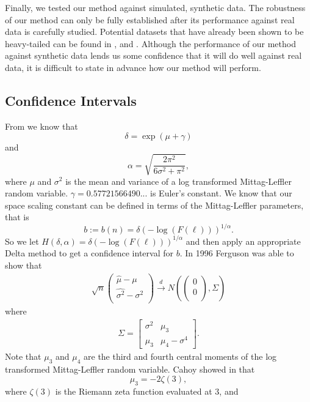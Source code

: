 \documentclass[honours,12pt]{unswthesis}
\newcommand{\1}{\mathbf 1}
\newcommand{\cd}{\overset{d}{\longrightarrow}}
\numberwithin{equation}{section}
\theoremstyle{definition}
\theoremstyle{remark}
\begin{document}
Finally, we tested our method against simulated, synthetic data. The robustness of our method can only be fully established after its performance against real data is carefully studied. Potential datasets that have already been shown to be heavy-tailed can be found in \cite{Karsai2012}, \cite{Resnick1995} and \cite{Mainardi2000}. Although the performance of our method against synthetic data lends us some confidence that it will do well against real data, it is difficult to state in advance how our method will perform. 

\begin{appendices}
\chapter{Confidence Intervals}
From \cite{Cahoy2013} we know that
\[
\delta=\exp(\mu +\gamma)
\]
and
\[
\alpha=\sqrt{\frac{2\pi^2}{6\sigma^2+\pi^2}},
\]
where $\mu$ and $\sigma^2$ is the mean and variance of a log transformed Mittag-Leffler random variable. $\gamma=0.57721566490...$ is Euler's constant. We know that our space scaling constant can be defined in terms of the Mittag-Leffler parameters, that is
\[ 
b:=b(n)=\delta(-\log(F(\ell)))^{1/\alpha}.
\]
So we let $H(\delta,\alpha)=\delta(-\log(F(\ell)))^{1/\alpha}$ and then apply an appropriate Delta method to get a confidence interval for $b$. In 1996 Ferguson was able to show that \cite{Ferguson1996}
\begin{align*}
	\sqrt{n}\begin{pmatrix}
				\hat{\mu}-\mu\\
				\hat{\sigma^2}-\sigma^2\\				
			\end{pmatrix}
			\cd
			N\left(\begin{pmatrix}0\\0\\ \end{pmatrix},\Sigma	\right)
\end{align*}
where
\begin{align*}
	\Sigma=\begin{bmatrix}
		\sigma^2	& \mu_3\\
		\mu_3		& \mu_4-\sigma^4
	\end{bmatrix}.
\end{align*}
Note that $\mu_3$ and $\mu_4$ are the third and fourth central moments of the log transformed Mittag-Leffler random variable. Cahoy showed in \cite{Cahoy2013} that
\[
\mu_3=-2\zeta(3),
\]
where $\zeta(3)$ is the Riemann zeta function evaluated at 3, and

\end{appendices}
\end{document}
